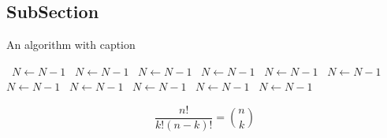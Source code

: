 \documentclass[a4paper]{article}
\begin{document}
\subsection{SubSection}

\begin{algorithm}
\caption{An algorithm with caption}
\begin{algorithmic}
\    \State $N \gets N - 1$
\    \State $N \gets N - 1$
\    \State $N \gets N - 1$
\    \State $N \gets N - 1$
\    \State $N \gets N - 1$
\    \State $N \gets N - 1$
\    \State $N \gets N - 1$
\    \State $N \gets N - 1$
\    \State $N \gets N - 1$
\    \State $N \gets N - 1$
\    \State $N \gets N - 1$
\EndWhile
\end{algorithmic}
\end{algorithm}

\[ \frac{n!}{k!(n-k)!} = \binom{n}{k} \]
\end{document}

